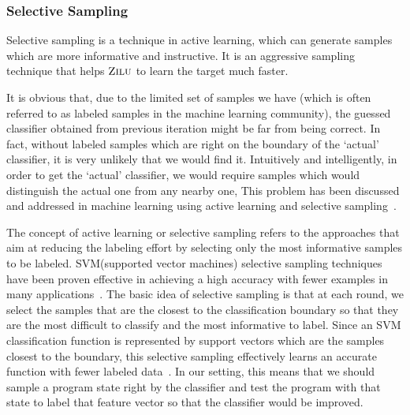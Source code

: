 \subsubsection{Selective Sampling}
Selective sampling is a technique in active learning, which can generate samples which are more informative and instructive.
It is an aggressive sampling technique that helps $\textsc{Zilu}$ to learn the target much faster.

It is obvious that, due to the limited set of samples we have (which is often referred to as labeled samples in the machine learning community), 
the guessed classifier obtained from previous iteration might be far from being correct. 
In fact, without labeled samples which are right on the boundary of the `actual' classifier, 
it is very unlikely that we would find it. 
Intuitively and intelligently, in order to get the `actual' classifier, 
we would require samples which would distinguish the actual one from any nearby one, 
This problem has been discussed and addressed in machine learning using active learning and selective sampling~\cite{DBLP:conf/icml/SchohnC00}.

The concept of active learning or selective sampling refers to the approaches 
that aim at reducing the labeling effort by selecting only the most informative samples to be labeled. 
SVM(supported vector machines) selective sampling techniques have been proven effective in achieving a high accuracy 
with fewer examples in many applications~\cite{DBLP:conf/mm/TongC01,DBLP:journals/jmlr/TongK01}. 
The basic idea of selective sampling is that at each round, we select the samples that are the closest to the classification boundary 
so that they are the most difficult to classify and the most informative to label. 
Since an SVM classification function is represented by support vectors which are the samples closest to the boundary, 
this selective sampling effectively learns an accurate function with fewer labeled data~\cite{DBLP:conf/icml/SchohnC00}. 
In our setting, this means that we should sample a program state right by the classifier and test the program 
with that state to label that feature vector so that the classifier would be improved.


